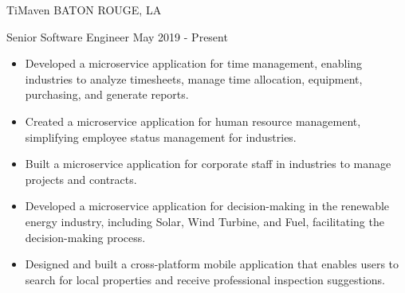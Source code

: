 \documentclass[10pt,a4paper]{article}
\begin{document}










\spacedhrule{0em}{-1em}


\headedsection
{TiMaven}
{\textsc{BATON ROUGE, LA}}
{
  \headedsubsection
  {Senior Software Engineer}
  {May 2019 - Present}
  {
    \begin{itemize}
      \item Developed a microservice application for time management, enabling industries to analyze timesheets, manage time allocation, equipment, purchasing, and generate reports.
      \item Created a microservice application for human resource management, simplifying employee status management for industries.
      \item Built a microservice application for corporate staff in industries to manage projects and contracts.
      \item Developed a microservice application for decision-making in the renewable energy industry, including Solar, Wind Turbine, and Fuel, facilitating the decision-making process.
      \item Designed and built a cross-platform mobile application that enables users to search for local properties and receive professional inspection suggestions.
    \end{itemize}
  }
}
\end{document}
